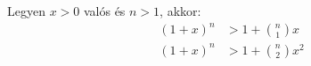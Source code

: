    Legyen $x>0$ valós és $n>1$, akkor:
   \begin{align*}
      {(1+x)}^n &> 1+{ n \choose 1}x \\
      {(1+x)}^n &> 1+  { n \choose 2}x^{2}
   \end{align*}
